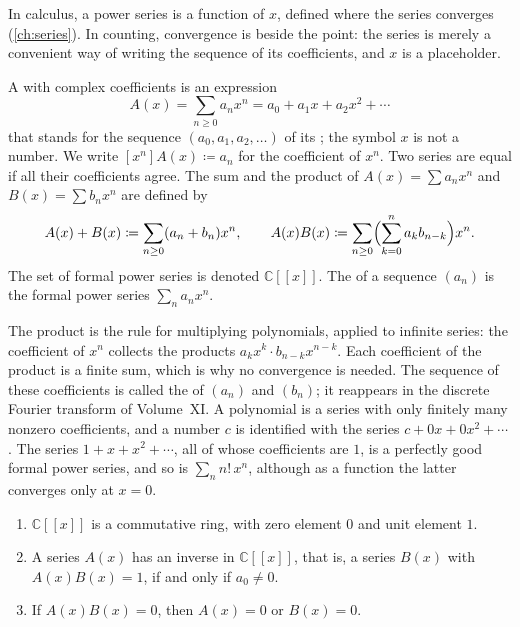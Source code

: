 In calculus, a power series is a function of $x$, defined where the series converges (\cref{ch:series}). In counting, convergence is beside the point: the series is merely a convenient way of writing the sequence of its coefficients, and $x$ is a placeholder.

\begin{definition}
\label{def:fps}
A  with complex coefficients is an expression
\[
A(x)=\sum_{n\ge0}a_nx^n=a_0+a_1x+a_2x^2+\cdots
\]
that stands for the sequence $(a_0,a_1,a_2,\ldots)$ of its ; the symbol $x$ is not a number. We write $[x^n]A(x)\coloneqq a_n$ for the coefficient of $x^n$. Two series are equal if all their coefficients agree. The sum and the product of $A(x)=\sum a_nx^n$ and $B(x)=\sum b_nx^n$ are defined by
\[
A(x)+B(x)\coloneqq\sum_{n\ge0}(a_n+b_n)x^n,\qquad A(x)B(x)\coloneqq\sum_{n\ge0}\Bigl(\sum_{k=0}^{n}a_kb_{n-k}\Bigr)x^n .
\]
The set of formal power series is denoted $\mathbb C[[x]]$. The  of a sequence $(a_n)$ is the formal power series $\sum_na_nx^n$.
\end{definition}

The product is the rule for multiplying polynomials, applied to infinite series: the coefficient of $x^n$ collects the products $a_kx^k\cdot b_{n-k}x^{n-k}$. Each coefficient of the product is a finite sum, which is why no convergence is needed. The sequence of these coefficients is called the  of $(a_n)$ and $(b_n)$; it reappears in the discrete Fourier transform of Volume~XI. A polynomial is a series with only finitely many nonzero coefficients, and a number $c$ is identified with the series $c+0x+0x^2+\cdots$. The series $1+x+x^2+\cdots$, all of whose coefficients are $1$, is a perfectly good formal power series, and so is $\sum_nn!\,x^n$, although as a function the latter converges only at $x=0$.

\begin{proposition}
\label{prop:fps-ring}
\leavevmode
\begin{enumerate}
\item $\mathbb C[[x]]$ is a commutative ring, with zero element $0$ and unit element $1$.
\item A series $A(x)$ has an inverse in $\mathbb C[[x]]$, that is, a series $B(x)$ with $A(x)B(x)=1$, if and only if $a_0\ne0$.
\item If $A(x)B(x)=0$, then $A(x)=0$ or $B(x)=0$.
\end{enumerate}
\end{proposition}

